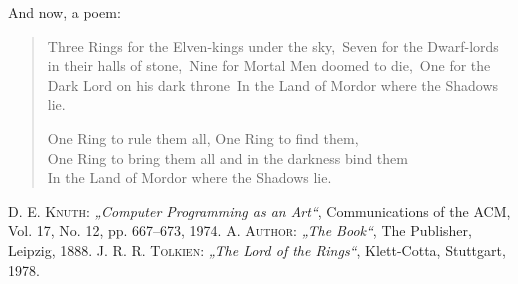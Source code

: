 \documentclass{scrreprt}
\begin{document}
	And now, a poem:
	\begin{verse}
		Three Rings for the Elven-kings under the sky,\
		Seven for the Dwarf-lords in their halls of stone,\
		Nine for Mortal Men doomed to die,\
		One for the Dark Lord on his dark throne\
		In the Land of Mordor where the Shadows lie.
		
		One Ring to rule them all, One Ring to find them,\\
			One Ring to bring them all and in the darkness bind them\\        
		In the Land of Mordor where the Shadows lie. \cite[P.\,7]{tolkien66}
	\end{verse}

	\appendix
	\printindex

	\begin{thebibliography}{9}
	 \textsc{D. E. Knuth}: \textit{„Computer Programming as an Art“}, Communications of the ACM, Vol. 17, No. 12, pp. 667–673, 1974.
	 \textsc{A. Author}: \textit{„The Book“}, The Publisher, Leipzig, 1888.
	 \textsc{J. R. R. Tolkien}: \textit{„The Lord of the Rings“}, Klett-Cotta, Stuttgart, 1978.
	\end{thebibliography}
\end{document}
